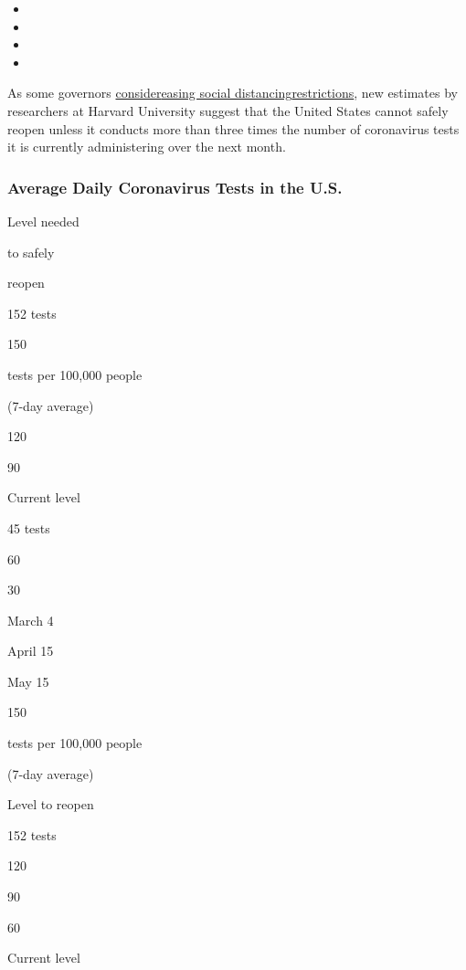 \begin{itemize}
\item
\item
\item
\item
\end{itemize}

As some governors
\href{https://www.nytimes3xbfgragh.onion/2020/04/17/us/coronavirus-cases-news-update.html\#link-35413772}{consider}\href{https://www.nytimes3xbfgragh.onion/2020/04/17/us/coronavirus-cases-news-update.html\#link-35413772}{easing
social
distancing}\href{https://www.nytimes3xbfgragh.onion/2020/04/17/us/coronavirus-cases-news-update.html\#link-35413772}{restrictions},
new estimates by researchers at Harvard University suggest that the
United States cannot safely reopen unless it conducts more than three
times the number of coronavirus tests it is currently administering over
the next month.

\hypertarget{average-daily-coronavirus-tests-in-the-us}{%
\subsubsection{Average Daily Coronavirus Tests in the
U.S.}\label{average-daily-coronavirus-tests-in-the-us}}

Level needed

to safely

reopen

152 tests

150

tests per 100,000 people

(7-day average)

120

90

Current level

45 tests

60

30

March 4

April 15

May 15

150

tests per 100,000 people

(7-day average)

Level to reopen

152 tests

120

90

60

Current level


